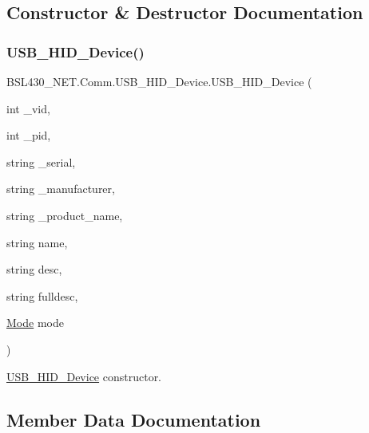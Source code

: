 \subsection{Constructor \& Destructor Documentation}
\mbox{\label{class_b_s_l430___n_e_t_1_1_comm_1_1_u_s_b___h_i_d___device_a64b6796688cc224acf3a01cbdeb3ada2}} 
\subsubsection{\texorpdfstring{USB\_HID\_Device()}{USB\_HID\_Device()}}
{\footnotesize\ttfamily B\+S\+L430\+\_\+\+N\+E\+T.\+Comm.\+U\+S\+B\+\_\+\+H\+I\+D\+\_\+\+Device.\+U\+S\+B\+\_\+\+H\+I\+D\+\_\+\+Device (\begin{DoxyParamCaption}\item[{int}]{\+\_\+vid,  }\item[{int}]{\+\_\+pid,  }\item[{string}]{\+\_\+serial,  }\item[{string}]{\+\_\+manufacturer,  }\item[{string}]{\+\_\+product\+\_\+name,  }\item[{string}]{name,  }\item[{string}]{desc,  }\item[{string}]{fulldesc,  }\item[{\mbox{\hyperlink{namespace_b_s_l430___n_e_t_aa1c6981cb6f279b5491d861ca555a1d7}{Mode}}}]{mode }\end{DoxyParamCaption})}



\mbox{\hyperlink{class_b_s_l430___n_e_t_1_1_comm_1_1_u_s_b___h_i_d___device}{U\+S\+B\+\_\+\+H\+I\+D\+\_\+\+Device}} constructor. 



\subsection{Member Data Documentation}
\mbox{\label{class_b_s_l430___n_e_t_1_1_comm_1_1_u_s_b___h_i_d___device_a95043e05504505463e0c10498975bcc2}} 
